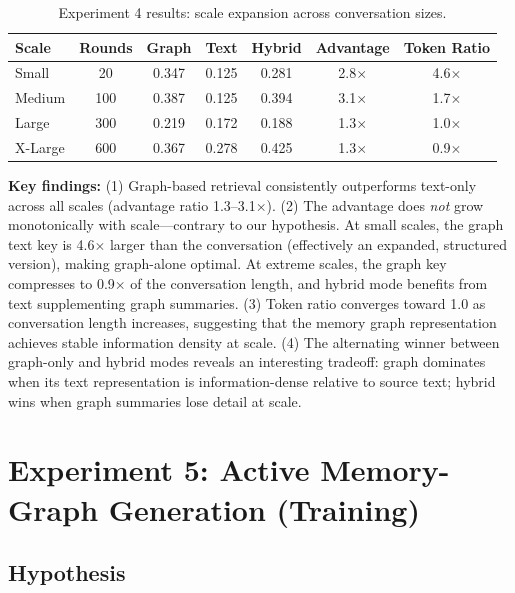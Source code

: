 \documentclass[11pt,a4paper]{article}
\begin{document}
\begin{table}[h]
\centering\footnotesize
\caption{Experiment 4 results: scale expansion across conversation sizes.}
\label{tab:exp4_res}
\begin{tabular}{lcccccc}
\toprule
\textbf{Scale} & \textbf{Rounds} & \textbf{Graph} & \textbf{Text} & \textbf{Hybrid} & \textbf{Advantage} & \textbf{Token Ratio} \\
\midrule
Small    & 20   & 0.347 & 0.125 & 0.281 & 2.8$\times$ & 4.6$\times$ \\
Medium   & 100  & 0.387 & 0.125 & 0.394 & 3.1$\times$ & 1.7$\times$ \\
Large    & 300  & 0.219 & 0.172 & 0.188 & 1.3$\times$ & 1.0$\times$ \\
X-Large  & 600  & 0.367 & 0.278 & 0.425 & 1.3$\times$ & 0.9$\times$ \\
\bottomrule
\end{tabular}
\end{table}

\textbf{Key findings:} (1) Graph-based retrieval consistently outperforms text-only across all scales (advantage ratio 1.3--3.1$\times$). (2) The advantage does \textit{not} grow monotonically with scale---contrary to our hypothesis. At small scales, the graph text key is 4.6$\times$ larger than the conversation (effectively an expanded, structured version), making graph-alone optimal. At extreme scales, the graph key compresses to 0.9$\times$ of the conversation length, and hybrid mode benefits from text supplementing graph summaries. (3) Token ratio converges toward 1.0 as conversation length increases, suggesting that the memory graph representation achieves stable information density at scale. (4) The alternating winner between graph-only and hybrid modes reveals an interesting tradeoff: graph dominates when its text representation is information-dense relative to source text; hybrid wins when graph summaries lose detail at scale.


\section{Experiment 5: Active Memory-Graph Generation (Training)}

\subsection{Hypothesis}
\end{document}
